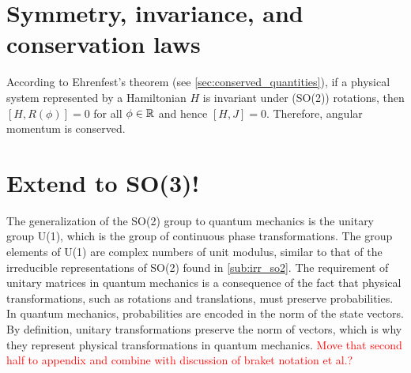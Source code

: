 
    \section{Symmetry, invariance, and conservation laws}

    According to Ehrenfest's theorem (see \cref{sec:conserved_quantities}), if a physical system represented by a Hamiltonian $H$ is invariant under (SO(2)) rotations, then $[H,R(\phi)] = 0$ for all $\phi\in\mathbb{R}$ and hence $[H,J]=0$. Therefore, angular momentum is conserved.


    \section{Extend to SO(3)!}\label{sub:phys_J}
    The generalization of the SO(2) group to quantum mechanics is the unitary group U(1), which is the group of continuous phase transformations. The group elements of U(1) are complex numbers of unit modulus, similar to that of the irreducible representations of SO(2) found in \cref{sub:irr_so2}. The requirement of unitary matrices in quantum mechanics is a consequence of the fact that physical transformations, such as rotations and translations, must preserve probabilities. In quantum mechanics, probabilities are encoded in the norm of the state vectors. By definition, unitary transformations preserve the norm of vectors, which is why they represent physical transformations in quantum mechanics. \textcolor{red}{Move that second half to appendix and combine with discussion of braket notation et al.?}

